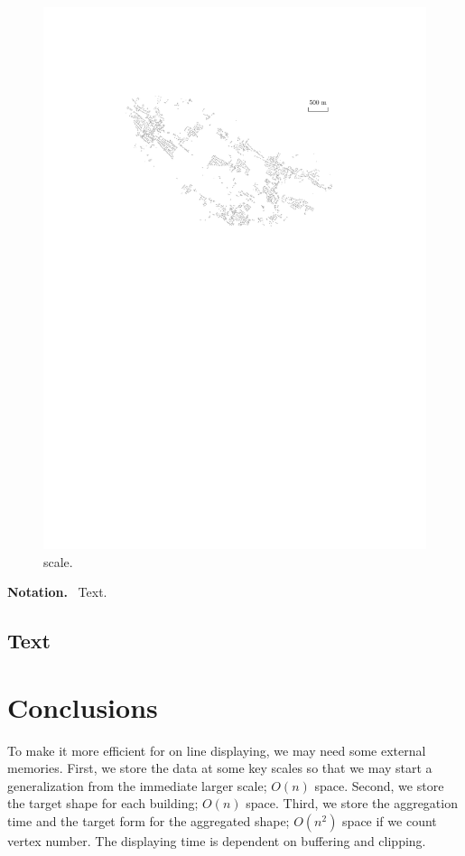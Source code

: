 \documentclass[graybox]{svmult}
\newcommand{\mypar}[1]{\bigskip\noindent\textbf{#1.}~}
\begin{document}
\begin{figure}[tb]
	\centering
	\includegraphics{Data}
	\caption{scale.}
	\label{fig:Data}
\end{figure}

\mypar{Notation}
Text. 

\subsection{Text}
\label{sec:Formalizing}



\section{Conclusions}
\label{sec:Conclusions}


To make it more efficient for on line displaying, we may need 
some external memories. First, we store the data at some key 
scales so that we may start a generalization from the immediate 
larger scale; $O(n)$ space. Second, we store the target shape 
for each building; $O(n)$ space. Third, we store the aggregation 
time and the target form for the aggregated shape; $O(n^2)$ 
space if we count vertex number.
%
The displaying time is dependent on buffering and clipping.
\end{document}
